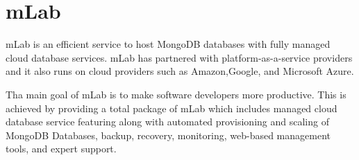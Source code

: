 \section{mLab}

mLab is an efficient service to host MongoDB databases with fully managed cloud
database services. mLab has partnered with platform-as-a-service providers and
it also runs on cloud providers such as Amazon,Google, and Microsoft Azure.

Tha main goal of mLab is to make software developers more productive.  This is
achieved by providing a total package of mLab which includes managed cloud
database service featuring along with automated provisioning and scaling of
MongoDB Databases, backup, recovery, monitoring, web-based management tools,
and expert support. \cite{mLab}